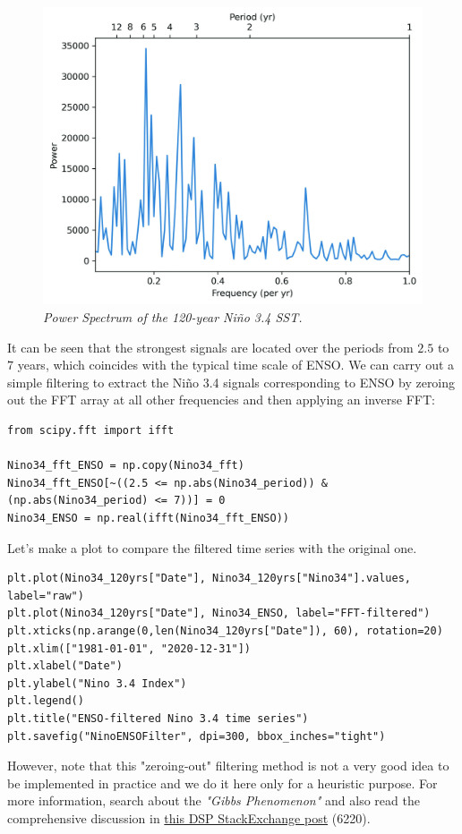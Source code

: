\begin{figure}[ht!]
    \centering
    \includegraphics[scale=0.75]{graphics/NinoFFT.jpg}
    \caption{\textit{Power Spectrum of the 120-year Niño 3.4 SST.}}
    \label{fig:Nino1}
\end{figure}
It can be seen that the strongest signals are located over the periods from $2.5$ to $7$ years, which coincides with the typical time scale of ENSO. We can carry out a simple filtering to extract the Niño 3.4 signals corresponding to ENSO by zeroing out the FFT array at all other frequencies and then applying an inverse FFT: 
\begin{lstlisting}
from scipy.fft import ifft

Nino34_fft_ENSO = np.copy(Nino34_fft)
Nino34_fft_ENSO[~((2.5 <= np.abs(Nino34_period)) & (np.abs(Nino34_period) <= 7))] = 0
Nino34_ENSO = np.real(ifft(Nino34_fft_ENSO))
\end{lstlisting}
Let's make a plot to compare the filtered time series with the original one.
\begin{lstlisting}
plt.plot(Nino34_120yrs["Date"], Nino34_120yrs["Nino34"].values, label="raw")
plt.plot(Nino34_120yrs["Date"], Nino34_ENSO, label="FFT-filtered")
plt.xticks(np.arange(0,len(Nino34_120yrs["Date"]), 60), rotation=20)
plt.xlim(["1981-01-01", "2020-12-31"])
plt.xlabel("Date")
plt.ylabel("Nino 3.4 Index")
plt.legend()
plt.title("ENSO-filtered Nino 3.4 time series")
plt.savefig("NinoENSOFilter", dpi=300, bbox_inches="tight")
\end{lstlisting}
However, note that this "zeroing-out" filtering method is not a very good idea to be implemented in practice and we do it here only for a heuristic purpose. For more information, search about the \textit{"Gibbs Phenomenon"} and also read the comprehensive discussion in   \href{https://stackoverflow.com/questions/31256252/why-does-numpy-linalg-solve-offer-more-precise-matrix-inversions-than-numpy-li}{this DSP StackExchange post} (6220).
